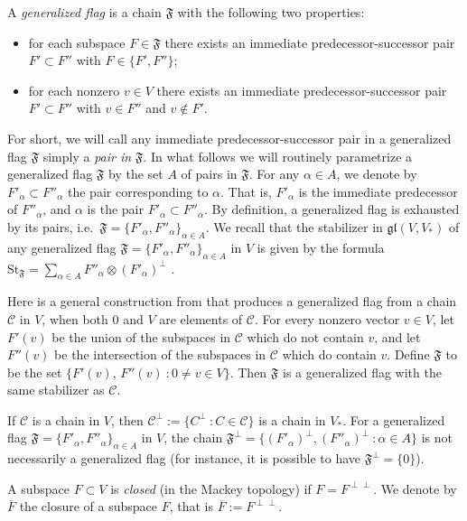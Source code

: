 \documentclass{article}
\newcommand {\St} {\mathrm{St}}
\def\gl{\mathfrak {gl}}
\def\F{\mathfrak{F}}
\def\Ch{\mathcal{C}}
\begin{document}
A \emph{generalized flag} is a chain $\F$ with the following two properties:
\begin{itemize}
\item[(i)] for each subspace $F \in \F$ there exists an immediate predecessor-successor pair $F' \subset F''$ with $F \in \{F' , F'' \}$;
\item[(ii)] \label{vectorpair} for each nonzero $v \in V$ there exists an immediate predecessor-successor pair $F' \subset F''$ with $v \in F''$ and $v \notin F'$.
\end{itemize}
For short, we will call any immediate predecessor-successor pair in a generalized flag $\F$ simply a \emph{pair in} $\F$. In what follows we will routinely parametrize a generalized flag $\F$ by the set $A$ of pairs in $\F$.  For any $\alpha \in A$, we denote by $F'_\alpha \subset F''_\alpha$ the pair corresponding to $\alpha$.  That is, $F'_\alpha$ is the immediate predecessor of $F''_\alpha$, and $\alpha$ is the pair $F'_\alpha \subset F''_\alpha$.  By definition, a generalized flag is exhausted by its pairs, i.e.\ $\F = \{ F'_\alpha , F''_\alpha \}_{\alpha \in A}$.  We recall that the stabilizer in $\gl(V,V_*)$ of any generalized flag $\F =  \{ F'_\alpha , F''_\alpha \}_{\alpha \in A}$ in $V$ is given by the formula $\St_\F = \sum_{\alpha \in A} F''_\alpha \otimes (F'_\alpha)^\perp$ \cite{DP2}.  

Here is a general construction from \cite{DP2} that produces a generalized flag from a chain $\Ch$ in $V$, when both $0$ and $V$ are elements of $\Ch$.  For every nonzero vector $v \in V$, let $F'(v)$ be the union of the subspaces in $\Ch$ which do not contain $v$, and let $F''(v)$ be the intersection of the subspaces in $\Ch$ which do contain $v$.  Define $\F$ to be the set $\{ F'(v) , \, F''(v) ~\colon 0 \neq v \in V \}$.  Then $\F$ is a generalized flag with the same stabilizer as $\Ch$.  

If $\Ch$ is a chain in $V$, then $\Ch^\perp := \{ C^\perp ~\colon C \in \Ch \}$ is a chain in $V_*$.  For a generalized flag $\F =  \{ F'_\alpha , F''_\alpha \}_{\alpha \in A}$ in $V$, the chain $\F^\perp = \{ (F'_\alpha)^\perp , (F''_\alpha)^\perp ~\colon \alpha \in A \}$ is not necessarily a generalized flag (for instance, it is possible to have $\F^\perp = \{0\}$).  

A subspace $F \subset V$ is \emph{closed} (in the Mackey topology) if $F=F^{\perp \perp}$.  We denote by $\overline{F}$ the closure of a subspace $F$, that is $\overline{F} := F^{\perp \perp}$.
\end{document}
